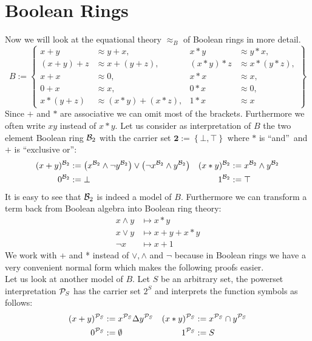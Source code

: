 \section{Boolean Rings}
Now we will look at the equational theory $\approx_B$ of Boolean rings in more detail.
\[B:=\left\lbrace 
	\begin{aligned}
		x+y     & \approx y+x,         & x*y     & \approx y*x,     \\
		(x+y)+z & \approx x+(y+z),     & (x*y)*z & \approx x*(y*z), \\
		x+x     & \approx 0,           & x*x     & \approx x,       \\
		0+x     & \approx x,           & 0*x     & \approx 0,       \\
		x*(y+z) & \approx (x*y)+(x*z), & 1*x     & \approx x        
	\end{aligned}
	\right\rbrace \]
	Since $+$ and $*$ are associative we can omit most of the brackets. Furthermore we often write $xy$ instead of $x*y$.
	Let us consider as interpretation of $B$ the two element Boolean ring ${\mathcal{B}_2}$ with the carrier set $\textbf{2}:=\left\lbrace\bot,\top\right\rbrace$ where $*$ is \textquotedblleft and\textquotedblright\ and $+$ is \textquotedblleft exclusive or\textquotedblright:
	\begin{align*}
		(x+y)^{\mathcal{B}_2} & :=\left( x^{\mathcal{B}_2}\wedge\neg y^{\mathcal{B}_2}\right)  \vee \left( \neg x^{\mathcal{B}_2}\wedge y^{\mathcal{B}_2}\right) & (x*y)^{\mathcal{B}_2} & :=x^{\mathcal{B}_2}\wedge y^{\mathcal{B}_2} \\
		0^{\mathcal{B}_2}     & :=\bot                                                                                      & 1^{\mathcal{B}_2}     & :=\top                
	\end{align*}
	It is easy to see that ${\mathcal{B}_2}$ is indeed a model of $B$. Furthermore we can transform a term back from Boolean algebra into Boolean ring theory:
	\begin{align*}
		x \wedge y & \mapsto x*y     \\
		x\vee y    & \mapsto x+y+x*y \\
		\neg x     & \mapsto x+1
	\end{align*}
	We work with + and * instead of $\vee,\wedge$ and $\neg$ because in Boolean rings we have a very convenient normal form which makes the following proofs easier.\\
	Let us look at another model of $B$. Let $S$ be an arbitrary set, the powerset interpretation ${\mathcal{P}_S}$ has the carrier set $2^S$ and interprets the function symbols as follows:
	\begin{align*}
		(x+y)^{\mathcal{P}_S} & :=x^{\mathcal{P}_S}\Delta y^{\mathcal{P}_S} & (x*y)^{\mathcal{P}_S} & :=x^{\mathcal{P}_S}\cap y^{\mathcal{P}_S} \\
		0^{\mathcal{P}_S}     & :=\emptyset             & 1^{\mathcal{P}_S}     & :=S                   
	\end{align*}
